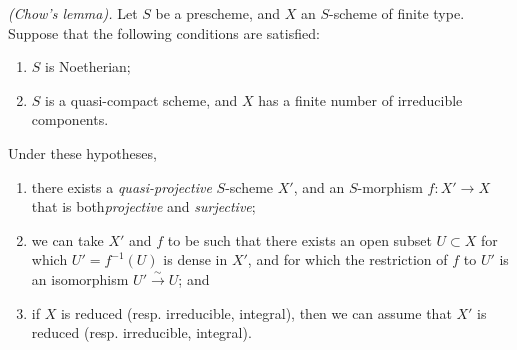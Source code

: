\begin{thm}[5.6.1]
\label{2.5.6.1}
\emph{(Chow's lemma).}
Let $S$ be a prescheme, and $X$ an $S$-scheme of finite type.
Suppose that the following conditions are satisfied:
\begin{enumerate}[label=\emph{(\alph*)}]
    \item $S$ is Noetherian;
    \item $S$ is a quasi-compact scheme, and $X$ has a finite number of irreducible components.
\end{enumerate}
Under these hypotheses,
\begin{enumerate}[label=\emph{(\roman*)}]
    \item there exists a \emph{quasi-projective} $S$-scheme $X'$, and an $S$-morphism $f:X'\to X$ that is both\emph{projective} and \emph{surjective};
    \item we can take $X'$ and $f$ to be such that there exists an open subset $U\subset X$ for which $U'=f^{-1}(U)$ is dense in $X'$, and for which the restriction of $f$ to $U'$ is an isomorphism $U'\xrightarrow{\sim}U$; and
    \item if $X$ is reduced (resp. irreducible, integral), then we can assume that $X'$ is reduced (resp. irreducible, integral).
\end{enumerate}
\end{thm}

